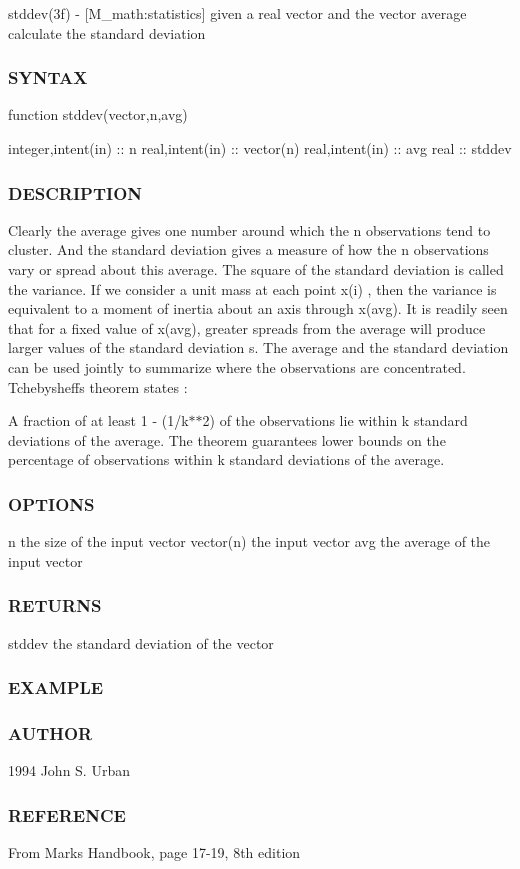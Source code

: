 stddev(3f) -\/ \mbox{[}M\+\_\+math\+:statistics\mbox{]} given a real vector and the vector average calculate the standard deviation \subsubsection*{S\+Y\+N\+T\+AX}

function stddev(vector,n,avg) 

integer,intent(in) \+:\+: n real,intent(in) \+:\+: vector(n) real,intent(in) \+:\+: avg real \+:\+: stddev \subsubsection*{D\+E\+S\+C\+R\+I\+P\+T\+I\+ON}

Clearly the average gives one number around which the n observations tend to cluster. And the standard deviation gives a measure of how the n observations vary or spread about this average. The square of the standard deviation is called the variance. If we consider a unit mass at each point x(i) , then the variance is equivalent to a moment of inertia about an axis through x(avg). It is readily seen that for a fixed value of x(avg), greater spreads from the average will produce larger values of the standard deviation s. The average and the standard deviation can be used jointly to summarize where the observations are concentrated. Tchebysheff\textquotesingle{}s theorem states \+:

A fraction of at least 1 -\/ (1/k$\ast$$\ast$2) of the observations lie within k standard deviations of the average. The theorem guarantees lower bounds on the percentage of observations within k standard deviations of the average. \subsubsection*{O\+P\+T\+I\+O\+NS}

n the size of the input vector vector(n) the input vector avg the average of the input vector

\subsubsection*{R\+E\+T\+U\+R\+NS}

stddev the standard deviation of the vector \subsubsection*{E\+X\+A\+M\+P\+LE}

\subsubsection*{A\+U\+T\+H\+OR}

1994 John S. Urban \subsubsection*{R\+E\+F\+E\+R\+E\+N\+CE}

From Mark\textquotesingle{}s Handbook, page 17-\/19, 8th edition 